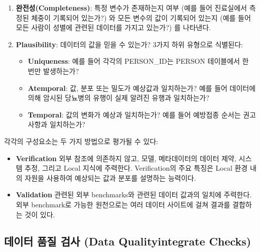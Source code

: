 \documentclass[11pt]{book}
\providecommand{\tightlist}{%
  \setlength{\itemsep}{0pt}\setlength{\parskip}{0pt}}
\theoremstyle{definition}
\theoremstyle{definition}
\theoremstyle{definition}
\theoremstyle{remark}
\begin{document}
\begin{enumerate}
\def\labelenumi{\arabic{enumi}.}
\setcounter{enumi}{1}
\tightlist
\item
  \textbf{완전성(Completeness)}: 특정 변수가 존재하는지 여부 (예를 들어
  진료실에서 측정된 체중이 기록되어 있는가?) 와 모든 변수의 값이
  기록되어 있는지 (예를 들어 모든 사람이 성별에 관련된 데이터를 가지고
  있는가?) 를 나타낸다.
\item
  \textbf{Plausibility}: 데이터의 값을 믿을 수 있는가? 3가지 하위
  유형으로 식별된다:

  \begin{itemize}
  \tightlist
  \item
    \textbf{Uniqueness}: 예를 들어 각각의 PERSON\_ID는 PERSON 테이블에서
    한 번만 발생하는가?
  \item
    \textbf{Atemporal}: 값, 분포 또는 밀도가 예상값과 일치하는가? 예를
    들어 데이터에 의해 암시된 당뇨병의 유행이 실제 알려진 유행과
    일치하는가?
  \item
    \textbf{Temporal}: 값의 변화가 예상과 일치하는가? 예를 들어 예방접종
    순서는 권고사항과 일치하는가?
  \end{itemize}

   
\end{enumerate}

각각의 구성요소는 두 가지 방법으로 평가될 수 있다:

\begin{itemize}
\tightlist
\item
  \textbf{Verification} 외부 참조에 의존하지 않고, 모델, 메타데이터의
  데이터 제약, 시스템 추정, 그리고 Local 지식에 주력한다. Verification의
  주요 특징은 Local 환경 내의 자원을 사용하여 예상되는 값과 분포를
  설명하는 능력이다.
\item
  \textbf{Validation} 관련된 외부 benchmarks와 관련된 데이터 값과의
  일치에 주력한다. 외부 benchmark로 가능한 원천으로는 여러 데이터
  사이트에 걸쳐 결과를 결합하는 것이 있다.
\end{itemize}

 

\subsection{데이터 품질 검사 (Data Qualityintegrate
Checks)}\label{---data-qualityintegrate-checks}
\end{document}
